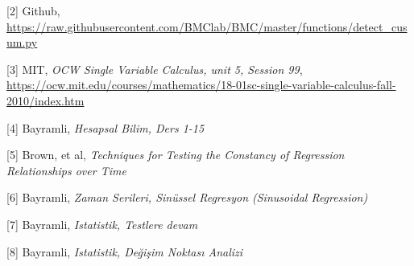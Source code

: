 \documentclass[12pt,fleqn]{article}\usepackage{../../common}
\begin{document}
[2] Github, \url{https://raw.githubusercontent.com/BMClab/BMC/master/functions/detect_cusum.py}

[3] MIT, {\em OCW Single Variable Calculus, unit 5, Session 99},
         \url{https://ocw.mit.edu/courses/mathematics/18-01sc-single-variable-calculus-fall-2010/index.htm}

[4] Bayramli, {\em Hesapsal Bilim, Ders 1-15}
         
[5] Brown, et al, {\em Techniques for Testing the Constancy of Regression Relationships over Time}

[6] Bayramli, {\em Zaman Serileri, Sinüssel Regresyon (Sinusoidal Regression)}

[7] Bayramli, {\em Istatistik, Testlere devam}

[8] Bayramli, {\em Istatistik, Değişim Noktası Analizi}
\end{document}

